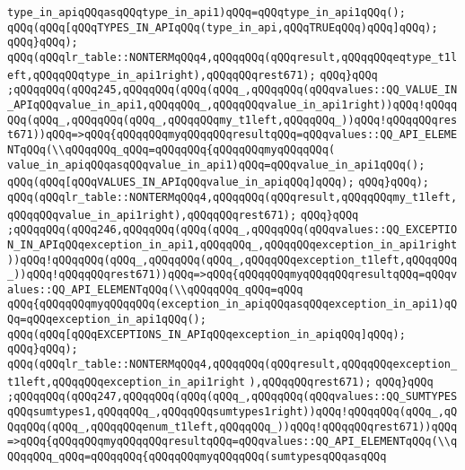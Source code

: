 \verb|type_in_apiqQQqasqQQqtype_in_api1)qQQq=qQQqtype_in_api1qQQq();|\newline
\verb|qQQq(qQQq[qQQqTYPES_IN_APIqQQq(type_in_api,qQQqTRUEqQQq)qQQq]qQQq);|\newline
\verb|qQQq}qQQq);|\newline
\verb|qQQq(qQQqlr_table::NONTERMqQQq4,qQQqqQQq(qQQqresult,qQQqqQQqeqtype_t1left,qQQqqQQqtype_in_api1right),qQQqqQQqrest671);|\newline
\verb|qQQq}qQQq|\newline
\verb|;qQQqqQQq(qQQq245,qQQqqQQq(qQQq(qQQq_,qQQqqQQq(qQQqvalues::QQ_VALUE_IN_APIqQQqvalue_in_api1,qQQqqQQq_,qQQqqQQqvalue_in_api1right))qQQq!qQQqqQQq(qQQq_,qQQqqQQq(qQQq_,qQQqqQQqmy_t1left,qQQqqQQq_))qQQq!qQQqqQQqrest671))qQQq=>qQQq{qQQqqQQqmyqQQqqQQqresultqQQq=qQQqvalues::QQ_API_ELEMENTqQQq(\\qQQqqQQq_qQQq=qQQqqQQq{qQQqqQQqmyqQQqqQQq(|\newline
\verb|value_in_apiqQQqasqQQqvalue_in_api1)qQQq=qQQqvalue_in_api1qQQq();|\newline
\verb|qQQq(qQQq[qQQqVALUES_IN_APIqQQqvalue_in_apiqQQq]qQQq);|\newline
\verb|qQQq}qQQq);|\newline
\verb|qQQq(qQQqlr_table::NONTERMqQQq4,qQQqqQQq(qQQqresult,qQQqqQQqmy_t1left,qQQqqQQqvalue_in_api1right),qQQqqQQqrest671);|\newline
\verb|qQQq}qQQq|\newline
\verb|;qQQqqQQq(qQQq246,qQQqqQQq(qQQq(qQQq_,qQQqqQQq(qQQqvalues::QQ_EXCEPTION_IN_APIqQQqexception_in_api1,qQQqqQQq_,qQQqqQQqexception_in_api1right))qQQq!qQQqqQQq(qQQq_,qQQqqQQq(qQQq_,qQQqqQQqexception_t1left,qQQqqQQq_))qQQq!qQQqqQQqrest671))qQQq=>qQQq{qQQqqQQqmyqQQqqQQqresultqQQq=qQQqvalues::QQ_API_ELEMENTqQQq(\\qQQqqQQq_qQQq=qQQq|\newline
\verb|qQQq{qQQqqQQqmyqQQqqQQq(exception_in_apiqQQqasqQQqexception_in_api1)qQQq=qQQqexception_in_api1qQQq();|\newline
\verb|qQQq(qQQq[qQQqEXCEPTIONS_IN_APIqQQqexception_in_apiqQQq]qQQq);|\newline
\verb|qQQq}qQQq);|\newline
\verb|qQQq(qQQqlr_table::NONTERMqQQq4,qQQqqQQq(qQQqresult,qQQqqQQqexception_t1left,qQQqqQQqexception_in_api1right|\newline
\verb|),qQQqqQQqrest671);|\newline
\verb|qQQq}qQQq|\newline
\verb|;qQQqqQQq(qQQq247,qQQqqQQq(qQQq(qQQq_,qQQqqQQq(qQQqvalues::QQ_SUMTYPESqQQqsumtypes1,qQQqqQQq_,qQQqqQQqsumtypes1right))qQQq!qQQqqQQq(qQQq_,qQQqqQQq(qQQq_,qQQqqQQqenum_t1left,qQQqqQQq_))qQQq!qQQqqQQqrest671))qQQq=>qQQq{qQQqqQQqmyqQQqqQQqresultqQQq=qQQqvalues::QQ_API_ELEMENTqQQq(\\qQQqqQQq_qQQq=qQQqqQQq{qQQqqQQqmyqQQqqQQq(sumtypesqQQqasqQQq|\newline
